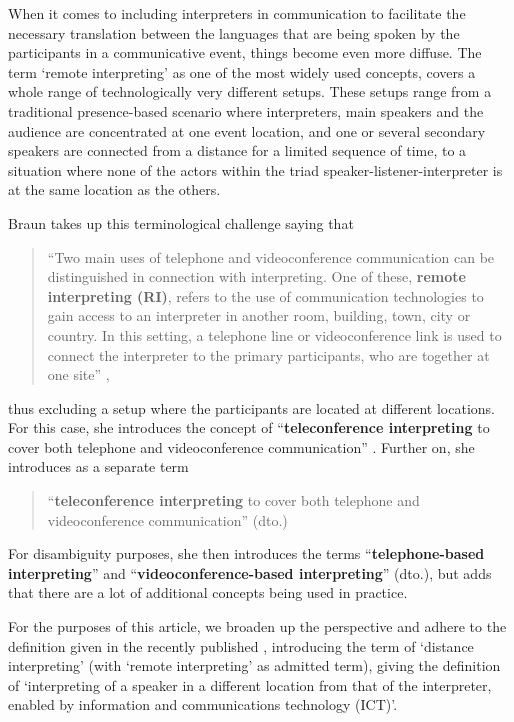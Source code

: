 \documentclass[output=paper]{langsci/langscibook}
\begin{document}
When it comes to including interpreters in communication to facilitate the necessary translation between the languages that are being spoken by the participants in a communicative event, things become even more diffuse. The term ‘remote interpreting’ as one of the most widely used concepts, covers a whole range of technologically very different setups. These setups range from a traditional presence-based scenario where interpreters, main speakers and the audience are concentrated at one event location, and one or several secondary speakers are connected from a distance for a limited sequence of time, to a situation where none of the actors within the triad speaker-listener-interpreter is at the same location as the others. 

Braun takes up this terminological challenge saying that 

\begin{quote}
	“Two main uses of telephone and videoconference communication can be distinguished in connection with interpreting. One of these, \textbf{remote interpreting (RI)}, refers to the use of communication technologies to gain access to an interpreter in another room, building, town, city or country. In this setting, a telephone line or videoconference link is used to connect the interpreter to the primary participants, who are together at one site” \citep[1]{Braun2015},
\end{quote}

thus excluding a setup where the participants are located at different locations. For this case, she introduces the concept of “\textbf{teleconference interpreting} to cover both telephone and videoconference communication” \citep[2]{Braun2015}. Further on, she introduces as a separate term

\begin{quote}
	“\textbf{teleconference interpreting} to cover both telephone and videoconference communication” (dto.)
\end{quote}

For disambiguity purposes, she then introduces the terms “\textbf{telephone-based interpreting}” and “\textbf{videoconference-based interpreting}” (dto.), but adds that there are a lot of additional concepts being used in practice.

For the purposes of this article, we broaden up the perspective and adhere to the definition given in the recently published \citet{ISO20108}, introducing the term of ‘distance interpreting’ (with ‘remote interpreting’ as admitted term), giving the definition of ‘interpreting of a speaker in a different location from that of the interpreter, enabled by information and communications technology (\textsc{ICT})’. 
\end{document}
